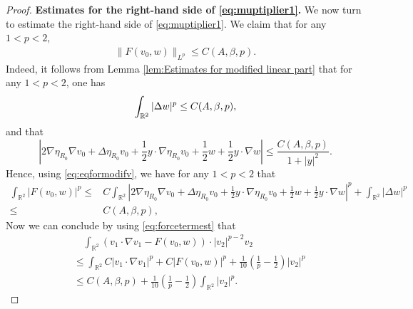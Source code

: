 \documentclass[12pt]{amsart}
\numberwithin{equation}{section}              %
\theoremstyle{remark}
\begin{document}
\begin{proof}
              \textbf{Estimates for the right-hand side of \eqref{eq:muptiplier1}.}
			We now turn to estimate  the right-hand side of \eqref{eq:muptiplier1}.
			We  claim that for any $1<p<2$,
			\begin{equation}\label{eq:forcetermest}
				\begin{aligned}
					\|F(v_0,w)	\|_{L^{p}}\leq C(A,\beta, p).
				\end{aligned}
			\end{equation}
			Indeed,  it follows from  Lemma \ref{lem:Estimates for modified linear part}  that for any $1<p<2$, one has
			\begin{equation*}
				\int_{\mathbb{R}^2} |\Delta w|^{p} \\
				\leq C(A,\beta, p),
			\end{equation*}
			and 	that
			\begin{equation*}
				\left|2 \nabla \eta_{R_0}\nabla 	v_0+\Delta \eta_{R_0}	v_0   +\frac{1}{2}y\cdot \nabla \eta_{R_0}	 v_0  + \frac{1}{2} w + \frac{1}{2}y\cdot \nabla  w\right|\leq \frac{C(A,\beta, p)}{1+|y|^2}.
			\end{equation*}
           Hence,  using \eqref{eq:eqformodifv}, we have for any $1<p<2$ that
			\begin{equation*}\label{eq:forceterms}
				\begin{aligned}
	\int_{\mathbb{R}^2}	|F(v_0,w)|^{p}
					\leq & C\int_{\mathbb{R}^2} \left|2 \nabla \eta_{R_0}\nabla 	v_0+\Delta \eta_{R_0}	v_0   +\frac{1}{2}y\cdot \nabla \eta_{R_0}	 v_0  + \frac{1}{2} w + \frac{1}{2}y\cdot \nabla  w\right|^{p} 
					 	+
					\int_{\mathbb{R}^2} |\Delta w|^{p}\\
                    \leq &
					C(A,\beta, p),
				\end{aligned}
			\end{equation*}	
		Now we can conclude by using \eqref{eq:forcetermest} that
			\begin{equation}\label{eq:force}
				\begin{aligned}
					&\quad	\int_{\mathbb{R}^2}	( v_1\cdot\nabla  v_1 - F(v_0,w))\cdot |v_2|^{p-2}v_2 \\
					&\leq \int_{\mathbb{R}^2}	 C| v_1\cdot\nabla  v_1|^{p} + C | F(v_0,w)|^{p} + \frac{1}{10}\left(\frac{1}{p}-\frac{1}{2}\right)|v_2|^{p}  \\
					& \leq C(A,\beta, p)+  \frac{1}{10}\left(\frac{1}{p}-\frac{1}{2}\right)\int_{\mathbb{R}^2} |v_2|^{p}.
				\end{aligned}
			\end{equation}

\end{proof}
\end{document}
